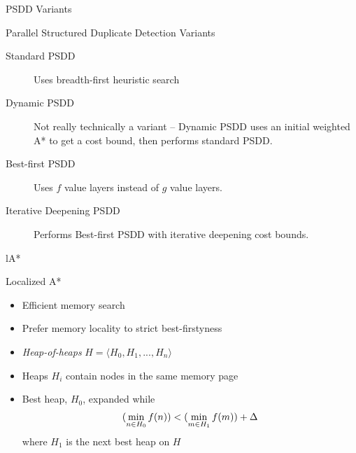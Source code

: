 \documentclass[style=unh]{powerdot}
\begin{document}
\begin{slide}{PSDD Variants}
  \vspace{.2in}
  \begin{center}
    Parallel Structured Duplicate Detection Variants
  \end{center}

  \begin{description}

  \item[Standard PSDD]
    Uses breadth-first heuristic search
  \item[Dynamic PSDD]
    Not really technically a variant -- Dynamic PSDD uses an initial
    weighted A* to get a cost bound, then performs standard PSDD.
  \item[Best-first PSDD]
    Uses $f$ value layers instead of $g$ value layers.
  \item[Iterative Deepening PSDD]
    Performs Best-first PSDD with iterative deepening cost bounds.
  \end{description}

\end{slide}


\begin{slide}{lA*}
  \vspace{.2in}
  \begin{center}
    Localized A*
  \end{center}

  \begin{itemize}
  \item Efficient memory search
  \item Prefer memory locality to strict best-firstyness
  \item \emph{Heap-of-heaps} $H = \langle H_0, H_1, ..., H_n \rangle$
  \item Heaps $H_i$ contain nodes in the same memory page
  \item Best heap, $H_0$, expanded while
    \begin{eqnarray*}
      (\mathop{\rm min}_{n \in H_0} f(n)) < (\mathop{\rm min}_{m \in H_1} f(m)) + \Delta
    \end{eqnarray*}
    where $H_1$ is the next best heap on $H$
  \end{itemize}

\end{slide}

\end{document}
